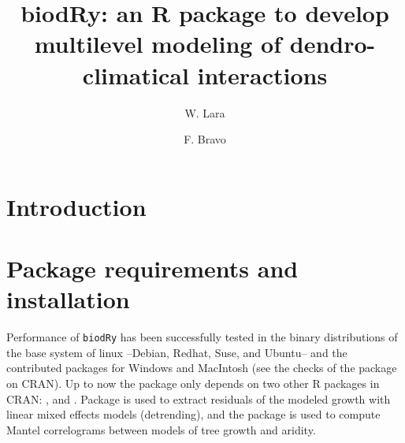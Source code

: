 \documentclass[review,authoryear]{elsarticle}
\begin{document}
\begin{frontmatter}
\title{\textbf{biodRy: an R package to develop multilevel modeling of
dendro-climatical interactions}}

\author[aut1]{W. Lara}
\author[aut1]{F. Bravo}


\address[aut1]{Sustainable Forest Management Research
  Institute,UVA-INIA, Avenida Madrid, s/n, 34071, Palencia, Spain}



\begin{abstract}
\end{abstract}
\begin{keyword}
\end{keyword}
\end{frontmatter}

\linenumbers
\section{Introduction}\label{sec:intro}


\section{Package requirements and installation}
Performance of {\tt biodRy} has been successfully tested in the binary
distributions of the base system of linux --Debian, Redhat, Suse, and
Ubuntu-- and the contributed packages for Windows and MacIntosh (see
the checks of the package on CRAN). Up to now the package only depends
on two other R packages in CRAN: \verb@nlme@ \citep{Pinheiro2000}, and
\verb@ecodist@\citep{Goslee2007}. Package \verb@nlme@ is used to
extract residuals of the modeled growth with linear mixed effects
models (detrending), and the package \verb@ecodist@ is used to compute
Mantel correlograms between models of tree growth and aridity.
\end{document}
